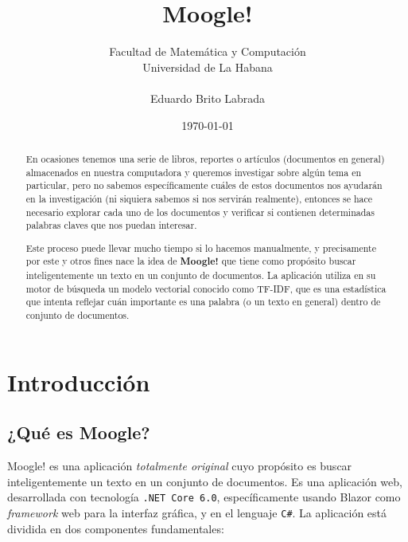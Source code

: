 \documentclass[a4paper, 12pt]{report}
\begin{document}
\title{{\bf \LARGE Moogle!}}
\author{Facultad de Matemática y Computación \\ Universidad de La Habana \\ \\ Eduardo Brito Labrada}
\date{\today}

\maketitle

\begin{abstract}
	En ocasiones tenemos una serie de libros, reportes o artículos (documentos en general) 
	almacenados en nuestra computadora y queremos investigar sobre algún tema en particular, 
	pero no sabemos específicamente cuáles de estos documentos nos ayudarán en la investigación
	(ni siquiera sabemos si nos servirán realmente), entonces se hace necesario explorar cada 
	uno de los documentos y verificar si contienen determinadas palabras claves que nos 
	puedan interesar. 
	
	Este proceso puede llevar mucho tiempo si lo hacemos
	manualmente, y precisamente por este y otros fines nace la idea de {\bf Moogle!} que tiene
	como propósito buscar inteligentemente un texto en un conjunto de documentos. La aplicación
	utiliza en su motor de búsqueda un modelo vectorial conocido como TF-IDF, que es una estadística
	que intenta reflejar cuán importante es una palabra (o un texto en general) dentro de conjunto de
	documentos.
\end{abstract}

\tableofcontents

\newpage

\section*{Introducción}

\subsection*{¿Qué es Moogle?}

Moogle! es una aplicación {\it totalmente original} cuyo propósito es buscar
inteligentemente un texto en un conjunto de documentos. Es una aplicación web,
desarrollada con tecnología {\tt .NET Core 6.0}, específicamente usando Blazor como 
{\it framework} web para la interfaz gráfica, y en el lenguaje {\tt C\#}. La aplicación 
está dividida en dos componentes fundamentales:
\end{document}
